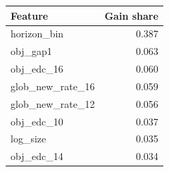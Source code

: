 \begin{tabular}{lr}
\toprule
Feature & Gain share \\
\midrule
horizon\_bin & 0.387 \\
obj\_gap1 & 0.063 \\
obj\_edc\_16 & 0.060 \\
glob\_new\_rate\_16 & 0.059 \\
glob\_new\_rate\_12 & 0.056 \\
obj\_edc\_10 & 0.037 \\
log\_size & 0.035 \\
obj\_edc\_14 & 0.034 \\
\bottomrule
\end{tabular}
